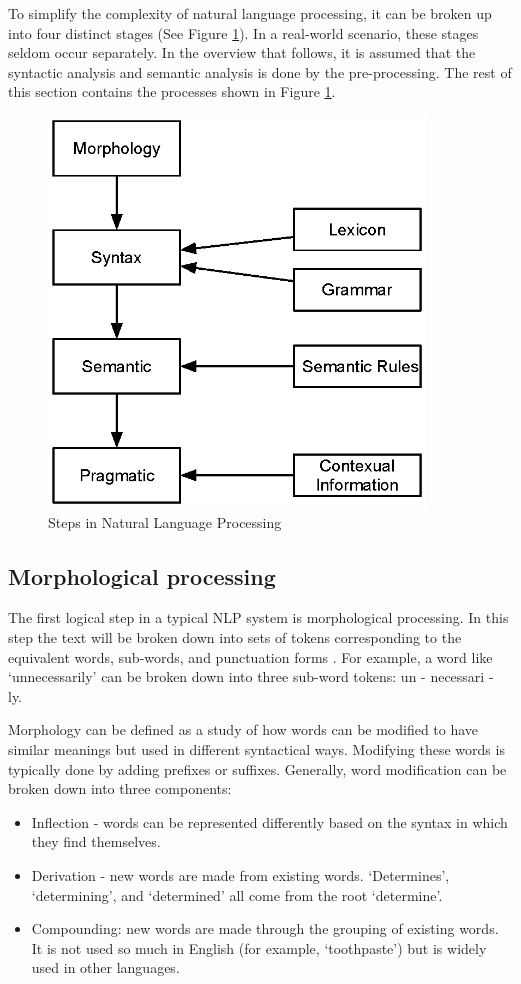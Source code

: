 To simplify the complexity of natural language processing, it can be broken up into four distinct stages (See Figure \ref{fig:stepsnlp}). In a real-world scenario, these stages seldom occur separately. In the overview that follows, it is assumed that the syntactic analysis and semantic analysis is done by the pre-processing.
The rest of this section contains the processes shown in Figure \ref{fig:stepsnlp}.

\begin{figure}[htbp]
\centering
\includegraphics[width=10cm]{./figures/NLPstep.eps}
\caption{Steps in Natural Language Processing}
\label{fig:stepsnlp}
\end{figure}
\subsection{Morphological processing}

The first logical step in a typical NLP system is morphological processing. In this step the text will be broken down into sets of tokens corresponding to the equivalent words, sub-words, and punctuation forms \cite{Bates9977}. For example, a word like ‘unnecessarily’ can be broken down into three sub-word tokens: un - necessari - ly.

Morphology can be defined as a study of how words can be modified to have similar meanings but used in different syntactical ways. Modifying these words is typically done by adding prefixes or suffixes. Generally, word modification can be broken down into three components:

\begin{itemize}
    \item Inflection - words can be represented differently based on the syntax in which they find themselves.
    \item Derivation - new words are made from existing words. ‘Determines’, ‘determining’, and ‘determined’ all come from the root ‘determine’.
    \item Compounding: new words are made through the grouping of existing words. It is not used so much in English (for example, ‘toothpaste’) but is widely used in other languages.
\end{itemize}

